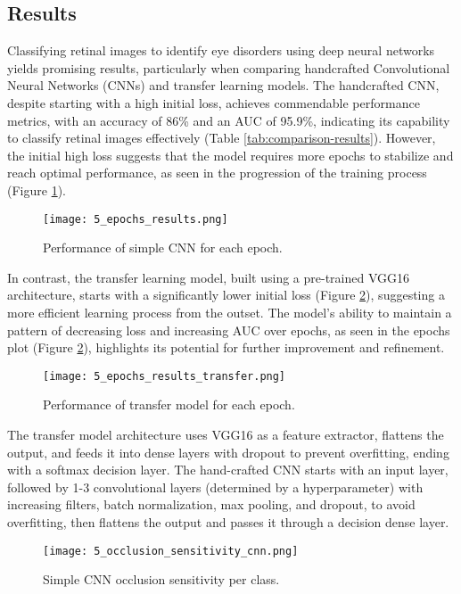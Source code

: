 \documentclass[a4paper,12pt]{article}
\begin{document}
\subsection{Results}
Classifying retinal images to identify eye disorders using deep neural networks yields promising results, particularly when comparing handcrafted Convolutional Neural Networks (CNNs) and transfer learning models. The handcrafted CNN, despite starting with a high initial loss, achieves commendable performance metrics, with an accuracy of 86\% and an AUC of 95.9\%, indicating its capability to classify retinal images effectively (Table \ref{tab:comparison-results}). However, the initial high loss suggests that the model requires more epochs to stabilize and reach optimal performance, as seen in the progression of the training process (Figure \ref{fig:epochs-5}).

\begin{figure}[h]
  \centering
  \texttt{[image: 5\_epochs\_results.png]}
  \caption{Performance of simple CNN for each epoch.}
  \label{fig:epochs-5}
\end{figure}

In contrast, the transfer learning model, built using a pre-trained VGG16 architecture, starts with a significantly lower initial loss (Figure \ref{fig:epochs-transfer-5}), suggesting a more efficient learning process from the outset. The model's ability to maintain a pattern of decreasing loss and increasing AUC over epochs, as seen in the epochs plot (Figure \ref{fig:epochs-transfer-5}), highlights its potential for further improvement and refinement.

\begin{figure}[h]
  \centering
  \texttt{[image: 5\_epochs\_results\_transfer.png]}
  \caption{Performance of transfer model for each epoch.}
  \label{fig:epochs-transfer-5}
\end{figure}

The transfer model architecture uses VGG16 as a feature extractor, flattens the output, and feeds it into dense layers with dropout to prevent overfitting, ending with a softmax decision layer. The hand-crafted CNN starts with an input layer, followed by 1-3 convolutional layers (determined by a hyperparameter) with increasing filters, batch normalization, max pooling, and dropout, to avoid overfitting, then flattens the output and passes it through a decision dense layer.


\begin{figure}[h]
  \centering
  \texttt{[image: 5\_occlusion\_sensitivity\_cnn.png]}
  \caption{Simple CNN occlusion sensitivity per class.}
  \label{fig:occlusion-cnn-5}
\end{figure}
\end{document}
